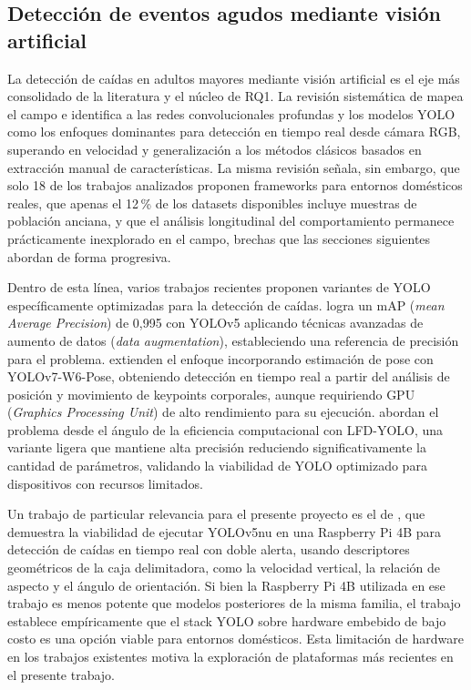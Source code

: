 \subsection{Detección de eventos agudos mediante visión artificial}
\label{sec:eventos}

La detección de caídas en adultos mayores mediante visión artificial es el eje más consolidado de la literatura y el núcleo de RQ1.
La revisión sistemática de \textcite{GayaMorey2024} mapea el campo e identifica a las redes convolucionales profundas y los modelos YOLO como los enfoques dominantes para detección en tiempo real desde cámara RGB, superando en velocidad y generalización a los métodos clásicos basados en extracción manual de características.
La misma revisión señala, sin embargo, que solo 18 de los trabajos analizados proponen frameworks para entornos domésticos reales, que apenas el 12\,\% de los datasets disponibles incluye muestras de población anciana, y que el análisis longitudinal del comportamiento permanece prácticamente inexplorado en el campo, brechas que las secciones siguientes abordan de forma progresiva.

Dentro de esta línea, varios trabajos recientes proponen variantes de YOLO específicamente optimizadas para la detección de caídas.
\textcite{Pereira2024} logra un mAP (\textit{mean Average Precision}) de 0,995 con YOLOv5 aplicando técnicas avanzadas de aumento de datos (\textit{data augmentation}), estableciendo una referencia de precisión para el problema.
\textcite{Tirziu2024} extienden el enfoque incorporando estimación de pose con YOLOv7-W6-Pose, obteniendo detección en tiempo real a partir del análisis de posición y movimiento de keypoints corporales, aunque requiriendo GPU (\textit{Graphics Processing Unit}) de alto rendimiento para su ejecución.
\textcite{Wang2025} abordan el problema desde el ángulo de la eficiencia computacional con LFD-YOLO, una variante ligera que mantiene alta precisión reduciendo significativamente la cantidad de parámetros, validando la viabilidad de YOLO optimizado para dispositivos con recursos limitados.

Un trabajo de particular relevancia para el presente proyecto es el de \textcite{Giri2025}, que demuestra la viabilidad de ejecutar YOLOv5nu en una Raspberry Pi 4B para detección de caídas en tiempo real con doble alerta, usando descriptores geométricos de la caja delimitadora, como la velocidad vertical, la relación de aspecto y el ángulo de orientación.
Si bien la Raspberry Pi 4B utilizada en ese trabajo es menos potente que modelos posteriores de la misma familia, el trabajo establece empíricamente que el stack YOLO sobre hardware embebido de bajo costo es una opción viable para entornos domésticos.
Esta limitación de hardware en los trabajos existentes motiva la exploración de plataformas más recientes en el presente trabajo.

